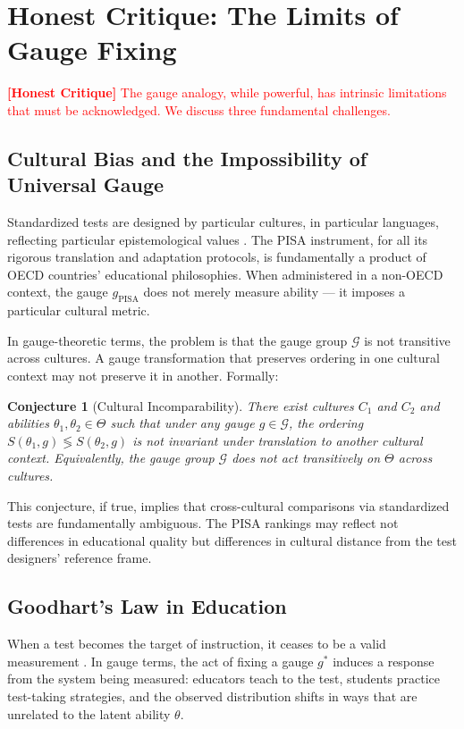 \documentclass[12pt,a4paper]{article}
\newtheorem{conjecture}[theorem]{Conjecture}
\theoremstyle{remark}
\newcommand{\G}{\mathcal{G}}
\newcommand{\honestcrit}[1]{\textcolor{red}{\textbf{[Honest Critique]} #1}}
\begin{document}
\section{Honest Critique: The Limits of Gauge Fixing}

\honestcrit{The gauge analogy, while powerful, has intrinsic limitations that must be acknowledged. We discuss three fundamental challenges.}

\subsection{Cultural Bias and the Impossibility of Universal Gauge}

Standardized tests are designed by particular cultures, in particular languages, reflecting particular epistemological values \cite{gould1981, steele1997}. The PISA instrument, for all its rigorous translation and adaptation protocols, is fundamentally a product of OECD countries' educational philosophies. When administered in a non-OECD context, the gauge $g_{\text{PISA}}$ does not merely measure ability --- it imposes a particular cultural metric.

In gauge-theoretic terms, the problem is that the gauge group $\G$ is not transitive across cultures. A gauge transformation that preserves ordering in one cultural context may not preserve it in another. Formally:

\begin{conjecture}[Cultural Incomparability]
\label{conj:incomparability}
There exist cultures $C_1$ and $C_2$ and abilities $\theta_1, \theta_2 \in \Theta$ such that under any gauge $g \in \G$, the ordering $S(\theta_1, g) \lessgtr S(\theta_2, g)$ is not invariant under translation to another cultural context. Equivalently, the gauge group $\G$ does not act transitively on $\Theta$ across cultures.
\end{conjecture}

This conjecture, if true, implies that cross-cultural comparisons via standardized tests are fundamentally ambiguous. The PISA rankings may reflect not differences in educational quality but differences in cultural distance from the test designers' reference frame.

\subsection{Goodhart's Law in Education}

When a test becomes the target of instruction, it ceases to be a valid measurement \cite{goodhart1975, campbell1979}. In gauge terms, the act of fixing a gauge $g^*$ induces a response from the system being measured: educators teach to the test, students practice test-taking strategies, and the observed distribution shifts in ways that are unrelated to the latent ability $\theta$.
\end{document}
